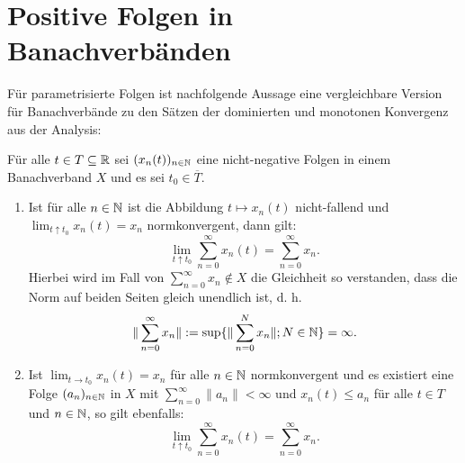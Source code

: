 \section{Positive Folgen in Banachverbänden}

\par
Für parametrisierte Folgen  ist nachfolgende Aussage eine vergleichbare Version für Banachverbände zu den Sätzen der dominierten und monotonen Konvergenz aus der Analysis:

\begin{satz}\label{Majorisierte Konvergenz in Banachverbänden}
Für alle $t\in T\subseteq \mathbb{R}$ sei $(x_n(t))_{n\in\mathbb{N}}$ eine nicht-negative Folgen in einem Banachverband $X$ und es sei $t_0\in \overline T$.
\begin{enumerate}
\item Ist für alle $n\in\mathbb{N}$ ist die Abbildung $t\mapsto x_n(t)$ nicht-fallend und $\lim_{t\uparrow t_0}x_n(t) =  x_n$ normkonvergent, dann gilt:
\begin{equation*}\label{toll}
\lim_{t\uparrow t_0}\sum_{n=0}^\infty x_n(t) = \sum_{n=0}^\infty x_n.
\end{equation*}
Hierbei wird im Fall von $\sum_{n=0}^\infty x_n\not\in X$ die Gleichheit so verstanden, dass die  Norm auf beiden Seiten gleich unendlich ist, d. h. 
\begin{equation*}
\|\sum_{n=0}^\infty x_n\|:=\sup\{\|\sum_{n=0}^N x_n\|; N\in\mathbb{N}\}= \infty.
\end{equation*}
\item Ist  $\lim_{t\to t_0} x_n(t)= x_n$ für alle $n\in\mathbb{N}$ normkonvergent und es existiert eine Folge $(a_n)_{n\in\mathbb{N}}$ in $X$ mit $\sum_{n=0}^\infty \|a_n \|<\infty$ und $x_n(t)\leq a_n$ für alle $t\in T$ und $n\in \mathbb{N}$, so gilt ebenfalls:
\begin{equation*}
\lim_{t\uparrow t_0}\sum_{n=0}^\infty x_n(t) = \sum_{n=0}^\infty x_n.    
\end{equation*}
\end{enumerate}
\end{satz}


